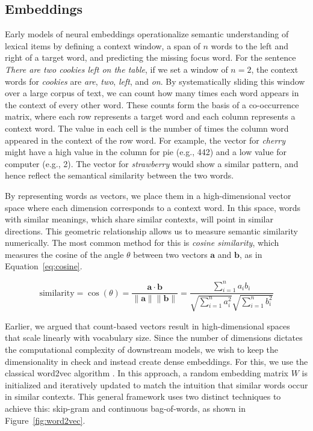 \subsection{Embeddings}\label{sec:cosine}
Early models of neural embeddings operationalize semantic understanding of lexical items by defining a context window, a span of $n$ words to the left and right of a target word, and predicting the missing focus word. For the sentence \textit{There are two cookies left on the table}, if we set a window of $n=2$, the context words for \textit{cookies} are \textit{are}, \textit{two}, \textit{left}, and \textit{on}. By systematically sliding this window over a large corpus of text, we can count how many times each word appears in the context of every other word. These counts form the basis of a co-occurrence matrix, where each row represents a target word and each column represents a context word. The value in each cell is the number of times the column word appeared in the context of the row word. For example, the vector for \textit{cherry} might have a high value in the column for pie (e.g., 442) and a low value for computer (e.g., 2). The vector for \textit{strawberry} would show a similar pattern, and hence reflect the semantical similarity between the two words.

By representing words as vectors, we place them in a high-dimensional vector space where each dimension corresponds to a context word. In this space, words with similar meanings, which share similar contexts, will point in similar directions. This geometric relationship allows us to measure semantic similarity numerically. The most common method for this is \emph{cosine similarity}, which measures the cosine of the angle $\theta$ between two vectors $\mathbf{a}$ and $\mathbf{b}$, as in Equation~\ref{eq:cosine}. 

\begin{equation}
    \label{eq:cosine}
\text{similarity} = \cos(\theta) = \frac{\mathbf{a} \cdot \mathbf{b}}{\|\mathbf{a}\| \|\mathbf{b}\|} = \frac{\sum_{i=1}^{n} a_i b_i}{\sqrt{\sum_{i=1}^{n} a_i^2} \sqrt{\sum_{i=1}^{n} b_i^2}}
\end{equation}


Earlier, we argued that count-based vectors result in high-dimensional spaces that scale linearly with vocabulary size. Since the number of dimensions dictates the computational complexity of downstream models, we wish to keep the dimensionality in check and instead create dense embeddings. For this, we use the classical word2vec algorithm \citep{mikolov2013efficient}. In this approach, a random embedding matrix $W$ is initialized and iteratively updated to match the intuition that similar words occur in similar contexts. This general framework uses two distinct techniques to achieve this: skip-gram and continuous bag-of-words, as shown in Figure~\ref{fig:word2vec}.

